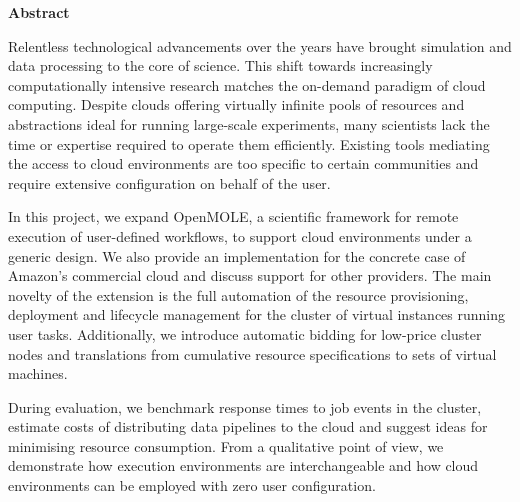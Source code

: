 \thispagestyle{empty}

\begin{center}
\vspace*{4cm}
\textbf{Abstract}
\end{center}

\vspace*{0.3cm}
\begin{spacing}{1.0}
Relentless technological advancements over the years have brought simulation and data processing to the core of science. This shift towards increasingly computationally intensive research matches the on-demand paradigm of cloud computing. Despite clouds offering virtually infinite pools of resources and abstractions ideal for running large-scale experiments, many scientists lack the time or expertise required to operate them efficiently. Existing tools mediating the access to cloud environments are too specific to certain communities and require extensive configuration on behalf of the user. 

In this project, we expand OpenMOLE, a scientific framework for remote execution of user-defined workflows, to support cloud environments under a generic design. We also provide an implementation for the concrete case of Amazon's commercial cloud and discuss support for other providers. The main novelty of the extension is the full automation of the resource provisioning, deployment and lifecycle management for the cluster of virtual instances running user tasks. Additionally, we introduce automatic bidding for low-price cluster nodes and translations from cumulative resource specifications to sets of virtual machines.

During evaluation, we benchmark response times to job events in the cluster, estimate costs of distributing data pipelines to the cloud and suggest ideas for minimising resource consumption. From a qualitative point of view, we demonstrate how execution environments are interchangeable and how cloud environments can be employed with zero user configuration.
\end{spacing}

\newpage
\blankpage









